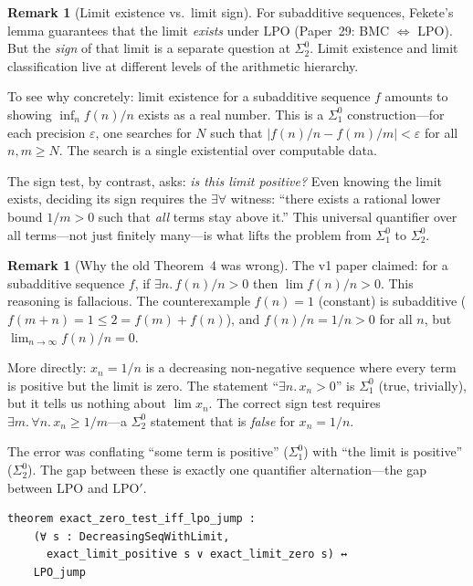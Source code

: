 \documentclass[11pt,a4paper]{article}
\theoremstyle{plain}
\theoremstyle{definition}
\newtheorem{remark}[theorem]{Remark}
\newcommand{\LPO}{\ensuremath{\mathrm{LPO}}}
\newcommand{\LPOj}{\ensuremath{\mathrm{LPO'}}}
\begin{document}
\begin{remark}[Limit existence vs.\ limit sign]\label{rem:existence-sign}
For subadditive sequences, Fekete's lemma guarantees that the
limit \emph{exists} under $\LPO$ (Paper~29: BMC $\Leftrightarrow$
$\LPO$).  But the \emph{sign} of that limit is a separate question
at $\Sigma_2^0$.  Limit existence and limit classification live
at different levels of the arithmetic hierarchy.

To see why concretely: limit existence for a subadditive sequence
$f$ amounts to showing $\inf_n f(n)/n$ exists as a real number.
This is a $\Sigma_1^0$ construction---for each precision $\varepsilon$,
one searches for $N$ such that $|f(n)/n - f(m)/m| < \varepsilon$
for all $n,m \geq N$.  The search is a single existential over
computable data.

The sign test, by contrast, asks: \emph{is this limit positive?}
Even knowing the limit exists, deciding its sign requires the
$\exists\forall$ witness: ``there exists a rational lower bound
$1/m > 0$ such that \emph{all} terms stay above it.''  This
universal quantifier over all terms---not just finitely many---is
what lifts the problem from $\Sigma_1^0$ to $\Sigma_2^0$.
\end{remark}

\begin{remark}[Why the old Theorem~4 was wrong]\label{rem:old-wrong}
The v1 paper claimed: for a subadditive sequence $f$, if
$\exists n.\, f(n)/n > 0$ then $\lim f(n)/n > 0$.  This reasoning
is fallacious.  The counterexample $f(n) = 1$ (constant) is
subadditive ($f(m+n) = 1 \leq 2 = f(m) + f(n)$), and
$f(n)/n = 1/n > 0$ for all $n$, but $\lim_{n\to\infty} f(n)/n = 0$.

More directly: $x_n = 1/n$ is a decreasing non-negative sequence
where every term is positive but the limit is zero.  The statement
``$\exists n.\, x_n > 0$'' is $\Sigma_1^0$ (true, trivially), but
it tells us nothing about $\lim x_n$.  The correct sign test requires
$\exists m.\, \forall n.\, x_n \geq 1/m$---a $\Sigma_2^0$ statement
that is \emph{false} for $x_n = 1/n$.

The error was conflating ``some term is positive'' ($\Sigma_1^0$)
with ``the limit is positive'' ($\Sigma_2^0$).  The gap between
these is exactly one quantifier alternation---the gap between
$\LPO$ and $\LPOj$.
\end{remark}

\begin{lstlisting}[caption={Exact zero-test: \texttt{ExtensiveCeiling.lean}}]
theorem exact_zero_test_iff_lpo_jump :
    (∀ s : DecreasingSeqWithLimit,
      exact_limit_positive s ∨ exact_limit_zero s) ↔
    LPO_jump
\end{lstlisting}
\end{document}
